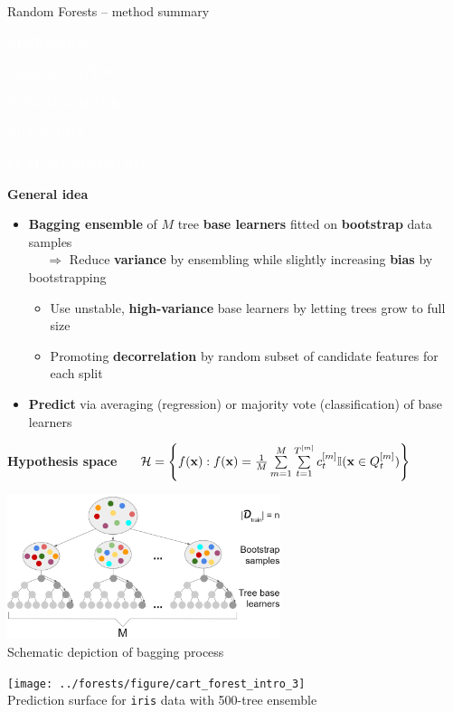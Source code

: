 \documentclass[11pt,compress,t,notes=noshow, xcolor=table]{beamer}
\newcommand{\highlight}[1]{\textcolor{hlcol}{\textbf{#1}}}
\newcommand{\maketag}[2][100]{
  \colorbox{hlcol!#1}{\textcolor{white}{\MakeUppercase{\scriptsize #2}} 
  \vphantom{}}
}
\begin{document}
\begin{vbframe}{Random Forests -- method summary}

\maketag{regression} \maketag{classification}
\maketag{NONPARAMETRIC} \maketag[50]{BLACK-BOX} \maketag{FEATURE SELECTION}

\medskip

\highlight{General idea} 
\begin{itemize}
  \item \textbf{Bagging ensemble} of $M$ tree \textbf{base learners} fitted on \textbf{bootstrap} data samples\\
   ~~ $\Rightarrow$ Reduce \textbf{variance} by ensembling while slightly increasing \textbf{bias} by bootstrapping  
   \begin{itemize}
    \item Use unstable, \textbf{high-variance} base learners by letting trees grow to full size
    \item Promoting \textbf{decorrelation} by random subset of candidate features for each split
  \end{itemize}
  \item \textbf{Predict} via averaging (regression) or majority vote (classification) of base learners
\end{itemize}

\medskip

\highlight{Hypothesis space} ~~
$\mathcal{H} = \left\{ f(\mathbf{x}): f(\mathbf{x}) = \frac{1}{M} \sum\limits_{m = 1}^M 
\sum\limits_{t = 1}^{T^{[m]}} 
c_t^{[m]} \mathbb{I}(\mathbf{x} \in Q_t^{[m]}) \right\}$


\begin{minipage}[b]{0.65\textwidth}
  \centering
  \includegraphics[width=0.6\textwidth]{figure/rf-bagging} \\
  \tiny Schematic depiction of bagging process
\end{minipage}%
\begin{minipage}[b]{0.35\textwidth}
\centering
  \texttt{[image: 
  ../forests/figure/cart\_forest\_intro\_3]} \\
  \tiny Prediction surface for \texttt{iris} data with 500-tree ensemble
\end{minipage}


\end{vbframe}
\end{document}
